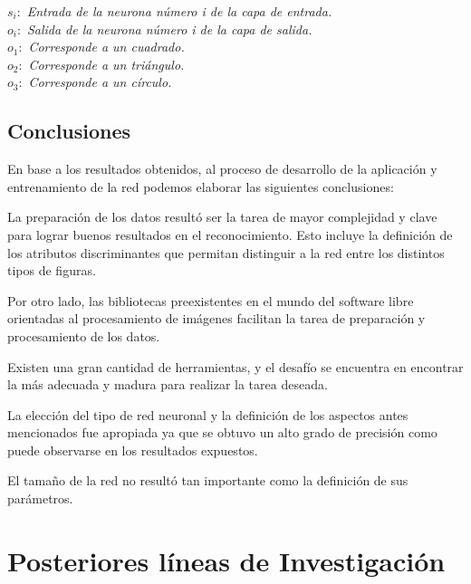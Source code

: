 \documentclass[pdftex,a4paper,10.5pt]{article}
\begin{document}
\begin{flushleft}
  $ s_{i}:  $	 \textit{ Entrada de la neurona n\'umero i de la capa de entrada.}\\
  $ o_{i}:  $	 \textit{ Salida de la neurona n\'umero i de la capa de salida. }\\
  $ o_{1}:  $	 \textit{ Corresponde a un cuadrado.}\\
  $ o_{2}:  $	 \textit{ Corresponde a un tri\'angulo.}\\
  $ o_{3}:  $	 \textit{ Corresponde a un c\'irculo.}\\
\end{flushleft}

	        

\newpage
\subsection{Conclusiones} %

	En base a los resultados obtenidos, al proceso de desarrollo de la aplicaci\'on y
	entrenamiento de la red podemos elaborar las siguientes conclusiones:
	
	La preparaci\'on de los datos result\'o ser la tarea de mayor complejidad y clave para
	lograr buenos resultados en el reconocimiento. Esto incluye la definici\'on de los atributos
	discriminantes que permitan distinguir a la red entre los distintos tipos de figuras.
	
	Por otro lado, las bibliotecas preexistentes en el mundo del software libre orientadas
	al procesamiento de im\'agenes facilitan la tarea de preparaci\'on y procesamiento 
	de los datos.

	Existen una gran cantidad de herramientas, y el desaf\'io se encuentra en encontrar
	la m\'as adecuada y madura para realizar la tarea deseada.

	La elecci\'on del tipo de red neuronal y la definici\'on de los aspectos antes mencionados
	fue apropiada ya que se obtuvo un alto grado de precisi\'on como puede observarse
	en los resultados expuestos.
	
	El tama\~no de la red no result\'o tan importante como la definici\'on de sus par\'ametros.

\section{Posteriores l\'ineas de Investigaci\'on} %
\end{document}

